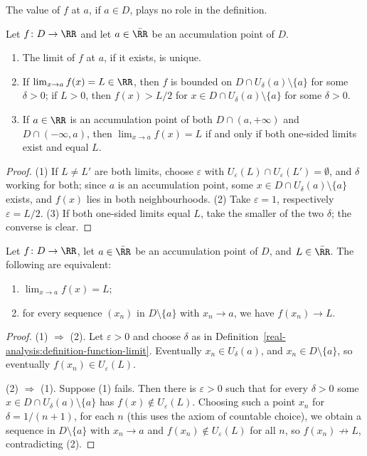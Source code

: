 The value of $f$ at $a$, if $a \in D$, plays no role in the definition.

\begin{proposition}\label{real-analysis:proposition-function-limit-basic}
Let $f \colon D \to \RR$ and let $a \in \bar{\RR}$ be an accumulation point of $D$.
\begin{enumerate}
\item The limit of $f$ at $a$, if it exists, is unique.
\item If $\lim_{x \to a}f(x) = L \in \RR$, then $f$ is bounded on $D \cap U_\delta(a) \setminus \{a\}$ for some $\delta > 0$; if $L > 0$, then $f(x) > L/2$ for $x \in D \cap U_\delta(a) \setminus \{a\}$ for some $\delta > 0$.
\item If $a \in \RR$ is an accumulation point of both $D \cap (a, +\infty)$ and $D \cap (-\infty, a)$, then $\lim_{x \to a}f(x) = L$ if and only if both one-sided limits exist and equal $L$.
\end{enumerate}
\end{proposition}

\begin{proof}
(1) If $L \neq L'$ are both limits, choose $\varepsilon$ with $U_\varepsilon(L) \cap U_\varepsilon(L') = \emptyset$, and $\delta$ working for both; since $a$ is an accumulation point, some $x \in D \cap U_\delta(a) \setminus \{a\}$
exists, and $f(x)$ lies in both neighbourhoods. (2) Take $\varepsilon = 1$, respectively $\varepsilon = L/2$. (3) If both one-sided limits equal $L$, take the smaller of the two $\delta$; the converse is clear.
\end{proof}

\begin{theorem}\label{real-analysis:theorem-sequential-limits}
Let $f \colon D \to \RR$, let $a \in \bar{\RR}$ be an accumulation point of $D$, and $L \in \bar{\RR}$. The following are equivalent:
\begin{enumerate}
\item $\lim_{x \to a}f(x) = L$;
\item for every sequence $(x_n)$ in $D \setminus \{a\}$ with $x_n \to a$, we have $f(x_n) \to L$.
\end{enumerate}
\end{theorem}

\begin{proof}
(1) $\Rightarrow$ (2). Let $\varepsilon > 0$ and choose $\delta$ as in Definition~\ref{real-analysis:definition-function-limit}. Eventually $x_n \in U_\delta(a)$, and $x_n \in D \setminus \{a\}$, so eventually
$f(x_n) \in U_\varepsilon(L)$.

(2) $\Rightarrow$ (1). Suppose (1) fails. Then there is $\varepsilon > 0$ such that for every $\delta > 0$ some $x \in D \cap U_\delta(a) \setminus \{a\}$ has $f(x) \notin U_\varepsilon(L)$. Choosing such a point $x_n$ for
$\delta = 1/(n + 1)$, for each $n$ (this uses the axiom of countable choice), we obtain a sequence in $D \setminus \{a\}$ with $x_n \to a$ and $f(x_n) \notin U_\varepsilon(L)$ for all $n$, so $f(x_n) \not\to L$,
contradicting (2).
\end{proof}

